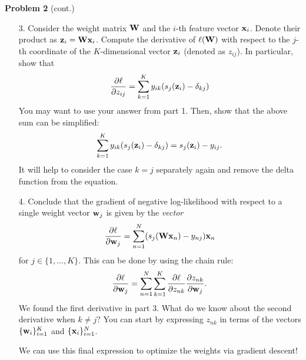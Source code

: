 \documentclass[submit]{harvardml}
\begin{document}
\begin{framed}
\noindent\textbf{Problem 2} (cont.)\\
\begin{enumerate}
    \item[3.] Consider the weight matrix $\mathbf{W}$ and the $i$-th feature vector $\mathbf{x}_i$. Denote their product as $\mathbf{z}_i = \mathbf{W}\mathbf{x}_i$. Compute the derivative of $\ell(\mathbf{W})$ with respect to the $j$-th coordinate of the $K$-dimensional vector $\mathbf{z}_i$ (denoted as $z_{ij}$). In particular, show that 
    $$
    \frac{\partial \ell}{\partial z_{ij}} = \sum_{k = 1}^K y_{ik}(s_j(\mathbf{z}_i) - \delta_{kj})
    $$
    You may want to use your answer from part 1. Then, show that the above sum can be simplified:
    $$
    \sum_{k = 1}^K y_{ik}(s_j(\mathbf{z}_i) - \delta_{kj}) = s_j(\mathbf{z}_i) - y_{ij}.
    $$
    It will help to consider the case $k = j$ separately again and remove the delta function from the equation.
    \item[4.] Conclude that the gradient of negative log-likelihood with respect to a single weight vector $\mathbf{w}_j$ is given by the \textit{vector}
    $$
    \frac{\partial \ell}{\partial \mathbf{w}_j} = \sum_{n = 1}^N(s_j(\mathbf{W}\mathbf{x}_n) - y_{nj})\mathbf{x}_n
    $$
    for $j \in \{1, \dots, K\}$. This can be done by using the chain rule:
    $$
    \frac{\partial \ell}{\partial \mathbf{w}_j} = \sum_{n = 1}^N\sum_{k = 1}^K\frac{\partial \ell}{\partial z_{nk}}\frac{\partial z_{nk}}{\partial \mathbf{w}_j}.
    $$
    We found the first derivative in part 3. What do we know about the second derivative when $k \neq j$? You can start by expressing $z_{nk}$ in terms of the vectors $\{\mathbf{w}_i\}_{i=1}^K$ and $\{\mathbf{x}_i\}_{i=1}^N$.
    
    We can use this final expression to optimize the weights via gradient descent!
\end{enumerate}
\end{framed}

\end{document}
